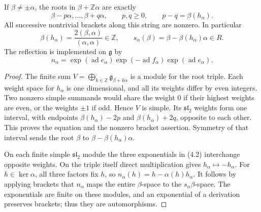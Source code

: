 \begin{theorem}\label{res:D04}
If \(\beta\ne\pm\alpha\), the roots in \(\beta+\mathbb Z\alpha\)
are exactly
\[
 \beta-p\alpha,\ldots,\beta+q\alpha,\qquad
 p,q\ge0,\qquad p-q=\beta(h_\alpha).
\]
All successive nontrivial brackets along this string are nonzero.
In particular
\[
 \beta(h_\alpha)=\frac{2(\beta,\alpha)}{(\alpha,\alpha)}\in\mathbb Z,
 \qquad
 s_\alpha(\beta)=\beta-\beta(h_\alpha)\alpha\in R.
\]
The reflection is implemented on \(\mathfrak g\) by
\[
 n_\alpha=
 \exp(\operatorname{ad}e_\alpha)
 \exp(-\operatorname{ad}f_\alpha)
 \exp(\operatorname{ad}e_\alpha).
 \tag{4.2}\label{eq:root-reflection-lift}
\]
\end{theorem}
\begin{proof}
The finite sum
\(V=\bigoplus_{k\in\mathbb Z}\mathfrak g_{\beta+k\alpha}\)
is a module for the root triple. Each weight space for
\(h_\alpha\) is one dimensional, and all its weights differ by
even integers. Two nonzero simple summands would share the
weight \(0\) if their highest weights are even, or the weights
\(\pm1\) if odd. Hence \(V\) is simple.
Its \(\mathfrak{sl}_2\) weights form one interval, with endpoints
\(\beta(h_\alpha)-2p\) and \(\beta(h_\alpha)+2q\), opposite to each
other. This proves the equation and the nonzero bracket assertion.
Symmetry of that interval sends the root \(\beta\) to
\(\beta-\beta(h_\alpha)\alpha\).

On each finite simple \(\mathfrak{sl}_2\) module the three
exponentials in (4.2) interchange opposite weights. On the triple
itself direct multiplication gives \(h_\alpha\mapsto-h_\alpha\).
For \(h\in\ker\alpha\), all three factors fix \(h\), so
\(n_\alpha(h)=h-\alpha(h)h_\alpha\).
It follows by applying brackets that \(n_\alpha\) maps the entire
\(\beta\)-space to the \(s_\alpha\beta\)-space.
The exponentials are finite on these modules, and an exponential
of a derivation preserves brackets; thus they are automorphisms.
\end{proof}

